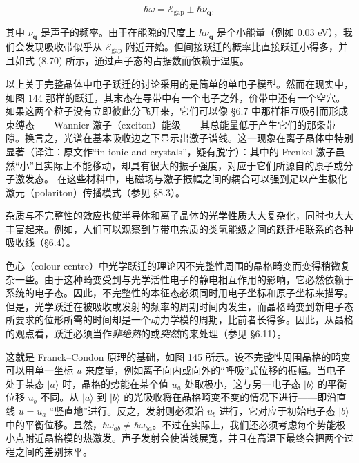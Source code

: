 \begin{equation*}
\hbar\omega = \mathcal{E}_{\mathrm{gap}} \pm \hbar\nu_{\mathbf{q}},
\tag{8.75}
\end{equation*}

其中 $\nu_{\mathbf{q}}$ 是声子的频率。由于在能隙的尺度上 $\hbar\nu_{\mathbf{q}}$ 是个小能量（例如 0.03 eV），我们会发现吸收带似乎从 $\mathcal{E}_{\mathrm{gap}}$ 附近开始。但间接跃迁的概率比直接跃迁小得多，并且如式 (8.70) 所示，通过声子态的占据数而依赖于温度。

以上关于完整晶体中电子跃迁的讨论采用的是简单的单电子模型。然而在现实中，如图 144 那样的跃迁，其末态在导带中有一个电子之外，价带中还有一个空穴。如果这两个粒子没有立即彼此分飞开来，它们可以像 §6.7 中那样相互吸引而形成束缚态——Wannier 激子（exciton）能级——其总能量低于产生它们的那条带隙。换言之，光谱在基本吸收边之下显示出激子谱线。这一现象在离子晶体中特别显著（译注：原文作“in ionic and crystals”，疑有脱字）：其中的 Frenkel 激子虽然“小”且实际上不能移动，却具有很大的振子强度，对应于它们所源自的原子或分子激发态。
在这些材料中，电磁场与激子振幅之间的耦合可以强到足以产生极化激元（polariton）传播模式（参见 §8.3）。

杂质与不完整性的效应也使半导体和离子晶体的光学性质大大复杂化，同时也大大丰富起来。例如，人们可以观察到与带电杂质的类氢能级之间的跃迁相联系的各种吸收线（§6.4）。

色心（colour centre）中光学跃迁的理论因不完整性周围的晶格畸变而变得稍微复杂一些。由于这种畸变受到与光学活性电子的静电相互作用的影响，它必然依赖于系统的电子态。因此，不完整性的本征态必须同时用电子坐标和原子坐标来描写。但是，光学跃迁在被吸收或发射的频率的周期时间内发生，而晶格畸变到新电子态所要求的位形所需的时间却是一个动力学模的周期，比前者长得多。因此，从晶格的观点看，跃迁必须当作\emph{非绝热}的或\emph{突然}的来处理（参见 §6.11）。

这就是 Franck–Condon 原理的基础，如图 145 所示。设不完整性周围晶格的畸变可以用单一坐标 $u$ 来度量，例如离子向内或向外的“呼吸”式位移的振幅。当电子处于某态 $|a\rangle$ 时，晶格的势能在某个值 $u_a$ 处取极小，这与另一电子态 $|b\rangle$ 的平衡位移 $u_b$ 不同。从 $|a\rangle$ 到 $|b\rangle$ 的光吸收将在晶格畸变不变的情况下进行——即沿直线 $u=u_a$ “竖直地”进行。反之，发射则必须沿 $u_b$ 进行，它对应于初始电子态 $|b\rangle$ 中的平衡位移。显然，$\hbar\omega_{ab}\neq\hbar\omega_{ba}$。不过在实际上，我们还必须考虑每个势能极小点附近晶格模的热激发。声子发射会使谱线展宽，并且在高温下最终会把两个过程之间的差别抹平。


